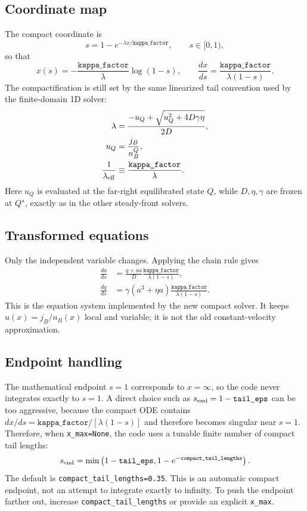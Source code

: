 \documentclass[11pt]{article}
\begin{document}
\subsection{Coordinate map}
The compact coordinate is
\begin{equation}
s = 1 - e^{-\lambda x/\texttt{kappa\_factor}}, \qquad s \in [0,1),
\end{equation}
so that
\begin{equation}
x(s) = -\frac{\texttt{kappa\_factor}}{\lambda}\log(1-s), \qquad
\frac{dx}{ds} = \frac{\texttt{kappa\_factor}}{\lambda(1-s)}.
\end{equation}
The compactification is still set by the same linearized tail convention used
by the finite-domain 1D solver:
\begin{align}
\lambda &=
\frac{-u_Q + \sqrt{u_Q^2 + 4D\gamma\eta}}{2D},\\
u_Q &= \frac{j_B}{n_B^Q},\\
\frac{1}{\lambda_{\rm eff}}
&\equiv \frac{\texttt{kappa\_factor}}{\lambda}.
\end{align}
Here $u_Q$ is evaluated at the far-right equilibrated state $Q$, while
$D,\eta,\gamma$ are frozen at $Q^\star$, exactly as in the other steady-front
solvers.

\subsection{Transformed equations}
Only the independent variable changes. Applying the chain rule gives
\begin{align}
\frac{da}{ds}
&= \frac{q+u a}{D}\frac{\texttt{kappa\_factor}}{\lambda(1-s)},\\
\frac{dq}{ds}
&= \gamma(a^3+\eta a)\frac{\texttt{kappa\_factor}}{\lambda(1-s)}.
\end{align}
This is the equation system implemented by the new compact solver. It keeps
$u(x)=j_B/n_B(x)$ local and variable; it is not the old constant-velocity
approximation.

\subsection{Endpoint handling}
The mathematical endpoint $s=1$ corresponds to $x=\infty$, so the code never
integrates exactly to $s=1$. A direct choice such as
$s_{\rm end}=1-\texttt{tail\_eps}$ can be too aggressive, because the compact
ODE contains $dx/ds=\texttt{kappa\_factor}/[\lambda(1-s)]$ and therefore becomes singular near
$s=1$. Therefore, when \texttt{x\_max=None}, the code uses a tunable finite
number of compact tail lengths:
\[
s_{\rm end}
= \min\left(1-\texttt{tail\_eps},
1-e^{-\texttt{compact\_tail\_lengths}}\right).
\]
The default is \texttt{compact\_tail\_lengths=0.35}. This is an automatic
compact endpoint, not an attempt to integrate exactly to infinity. To push the
endpoint farther out, increase \texttt{compact\_tail\_lengths} or provide an
explicit \texttt{x\_max}.
\end{document}
